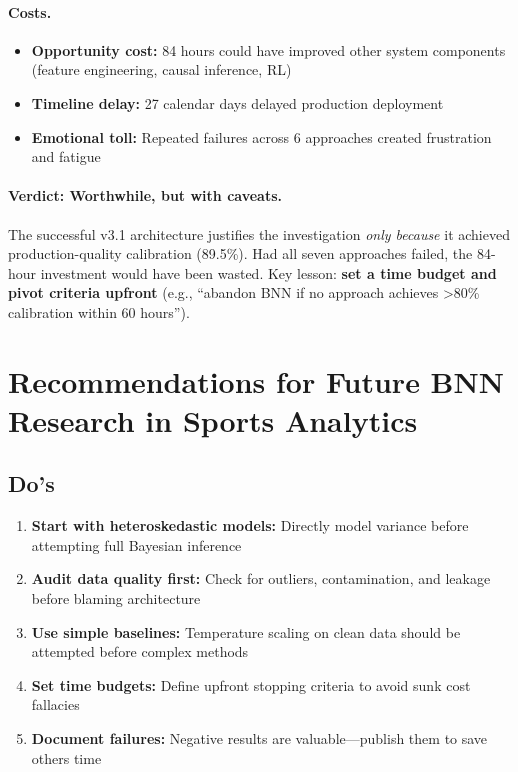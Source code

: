 \paragraph{Costs.}
\begin{itemize}
  \item \textbf{Opportunity cost:} 84 hours could have improved other system components (feature engineering, causal inference, RL)
  \item \textbf{Timeline delay:} 27 calendar days delayed production deployment
  \item \textbf{Emotional toll:} Repeated failures across 6 approaches created frustration and fatigue
\end{itemize}

\paragraph{Verdict: Worthwhile, but with caveats.}
The successful v3.1 architecture justifies the investigation \emph{only because} it achieved production-quality calibration (89.5\%). Had all seven approaches failed, the 84-hour investment would have been wasted. Key lesson: \textbf{set a time budget and pivot criteria upfront} (e.g., ``abandon BNN if no approach achieves >80\% calibration within 60 hours'').

\section{Recommendations for Future BNN Research in Sports Analytics}

\subsection{Do's}

\begin{enumerate}
  \item \textbf{Start with heteroskedastic models:} Directly model variance before attempting full Bayesian inference
  \item \textbf{Audit data quality first:} Check for outliers, contamination, and leakage before blaming architecture
  \item \textbf{Use simple baselines:} Temperature scaling on clean data should be attempted before complex methods
  \item \textbf{Set time budgets:} Define upfront stopping criteria to avoid sunk cost fallacies
  \item \textbf{Document failures:} Negative results are valuable—publish them to save others time
\end{enumerate}

